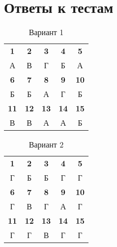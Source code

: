 \documentclass[12pt,a4paper]{article}
\begin{document}
\pagebreak


\section{Ответы к тестам}

\begin{table}[H]
  \centering
  \caption{Вариант 1}
    \begin{tabular}{ccccc}
    \toprule
    \textbf{1} & \textbf{2} & \textbf{3} & \textbf{4} & \textbf{5} \\
    А     & В     & Г     & Б     & А \\
    \midrule
    \textbf{6} & \textbf{7} & \textbf{8} & \textbf{9} & \textbf{10} \\
    Б     & Б     & А     & Г     & Б \\
    \midrule
    \textbf{11} & \textbf{12} & \textbf{13} & \textbf{14} & \textbf{15} \\
    В     & В     & А     & А     & Б \\
    \bottomrule
    \end{tabular}%
  \label{tab:addlabel}%
\end{table}%

\begin{table}[H]
  \centering
  \caption{Вариант 2}
    \begin{tabular}{ccccc}
    \toprule
    \textbf{1} & \textbf{2} & \textbf{3} & \textbf{4} & \textbf{5} \\
    Г     & Б     & Б     & Г     & Г \\
    \midrule
    \textbf{6} & \textbf{7} & \textbf{8} & \textbf{9} & \textbf{10} \\
    Г     & В     & Г     & А     & Г \\
    \midrule
    \textbf{11} & \textbf{12} & \textbf{13} & \textbf{14} & \textbf{15} \\
    Г     & Г     & В     & Г     & Г \\
    \bottomrule
    \end{tabular}%
  \label{tab:addlabel}%
\end{table}%
\end{document}
